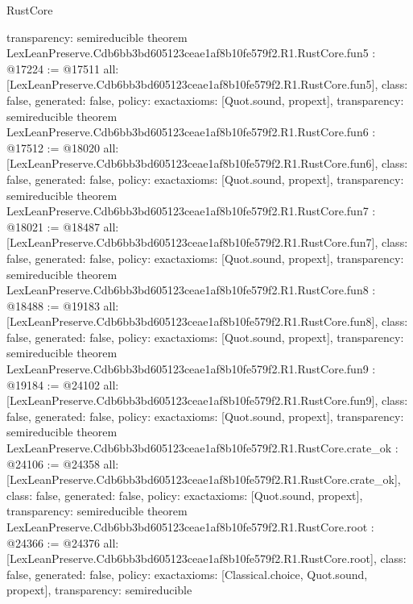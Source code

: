 \begin{lexlean}{RustCore}
\begin{coremodule}
{  transparency: semireducible
}
theorem LexLeanPreserve.Cdb6bb3bd605123ceae1af8b10fe579f2.R1.RustCore.fun5 : @17224 := @17511 {
  all: [LexLeanPreserve.Cdb6bb3bd605123ceae1af8b10fe579f2.R1.RustCore.fun5],
  class: false,
  generated: false,
  policy: exact{axioms: [Quot.sound, propext]},
  transparency: semireducible
}
theorem LexLeanPreserve.Cdb6bb3bd605123ceae1af8b10fe579f2.R1.RustCore.fun6 : @17512 := @18020 {
  all: [LexLeanPreserve.Cdb6bb3bd605123ceae1af8b10fe579f2.R1.RustCore.fun6],
  class: false,
  generated: false,
  policy: exact{axioms: [Quot.sound, propext]},
  transparency: semireducible
}
theorem LexLeanPreserve.Cdb6bb3bd605123ceae1af8b10fe579f2.R1.RustCore.fun7 : @18021 := @18487 {
  all: [LexLeanPreserve.Cdb6bb3bd605123ceae1af8b10fe579f2.R1.RustCore.fun7],
  class: false,
  generated: false,
  policy: exact{axioms: [Quot.sound, propext]},
  transparency: semireducible
}
theorem LexLeanPreserve.Cdb6bb3bd605123ceae1af8b10fe579f2.R1.RustCore.fun8 : @18488 := @19183 {
  all: [LexLeanPreserve.Cdb6bb3bd605123ceae1af8b10fe579f2.R1.RustCore.fun8],
  class: false,
  generated: false,
  policy: exact{axioms: [Quot.sound, propext]},
  transparency: semireducible
}
theorem LexLeanPreserve.Cdb6bb3bd605123ceae1af8b10fe579f2.R1.RustCore.fun9 : @19184 := @24102 {
  all: [LexLeanPreserve.Cdb6bb3bd605123ceae1af8b10fe579f2.R1.RustCore.fun9],
  class: false,
  generated: false,
  policy: exact{axioms: [Quot.sound, propext]},
  transparency: semireducible
}
theorem LexLeanPreserve.Cdb6bb3bd605123ceae1af8b10fe579f2.R1.RustCore.crate_ok : @24106 := @24358 {
  all: [LexLeanPreserve.Cdb6bb3bd605123ceae1af8b10fe579f2.R1.RustCore.crate_ok],
  class: false,
  generated: false,
  policy: exact{axioms: [Quot.sound, propext]},
  transparency: semireducible
}
theorem LexLeanPreserve.Cdb6bb3bd605123ceae1af8b10fe579f2.R1.RustCore.root : @24366 := @24376 {
  all: [LexLeanPreserve.Cdb6bb3bd605123ceae1af8b10fe579f2.R1.RustCore.root],
  class: false,
  generated: false,
  policy: exact{axioms: [Classical.choice, Quot.sound, propext]},
  transparency: semireducible
}


\end{coremodule}
\end{lexlean}
